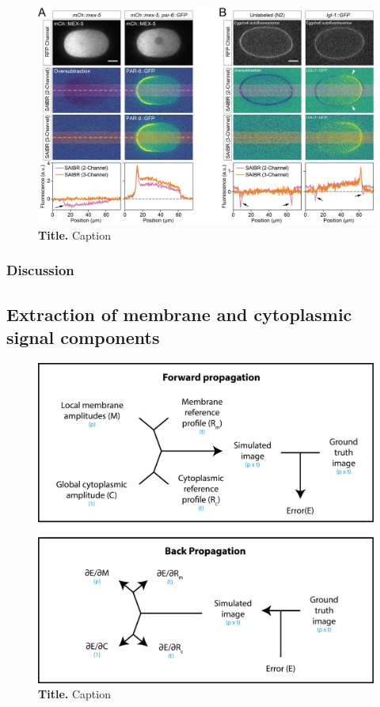 \documentclass[11pt]{"article"}
\newcommand{\mycaption}[2]{\caption[#1]{\textbf{#1.} #2}}
\begin{document}
\begin{figure}[!h]
\includegraphics[scale=0.9]{saibr_3channel_correction}
\setlength{\abovecaptionskip}{20pt}
\centering
\mycaption{Title}{Caption}
\end{figure}

\clearpage
\subsubsection{Discussion}

\clearpage
\subsection{Extraction of membrane and cytoplasmic signal components}


\begin{figure}[!h]
\includegraphics[scale=1]{memquant_forward_and_back_propagation}
\setlength{\abovecaptionskip}{20pt}
\centering
\mycaption{Title}{Caption}
\end{figure}
\end{document}
